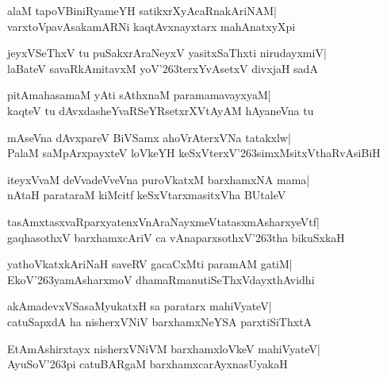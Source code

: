 \documentclass[twoside,12pt,openright]{book}
\def\S{\char'263}
\newcounter{shloka}[chapter]
\begin{document}
\begin{shloka}%
alaM tapoVBiniRyameYH satikxrXyAcaRnakAriNAM|\\
varxtoVpavAsakamARNi kaqtAvxnayxtarx mahAnatxyXpi
\end{shloka}

\begin{shloka}%
jeyxVSeThxV tu puSakxrAraNeyxV yasitxSaThxti nirudayxmiV|\\
laBateV savaRkAmitavxM yoV\S terxYvAsetxV divxjaH sadA
\end{shloka}

\begin{shloka}%
pitAmahasamaM yAti sAthxnaM paramamavayxyaM|\\
kaqteV tu dAvxdasheYvaRSeYRsetxrXVtAyAM hAyaneVna tu
\end{shloka}

\begin{shloka}%
mAseVna dAvxpareV BiVSamx ahoVrAterxVNa tatakxlw|\\
PalaM saMpArxpayxteV loVkeYH keSxVterxV\S simxMsitxVthaRvAsiBiH
\end{shloka}

\begin{shloka}%
iteyxVvaM deVvadeVveVna puroVkatxM barxhamxNA mama|\\
nAtaH parataraM kiMcitf keSxVtarxmasitxVha BUtaleV
\end{shloka}

\begin{shloka}%
tasAmxtasxvaRparxyatenxVnAraNayxmeVtatasxmAsharxyeVtf|\\
gaqhasothxV barxhamxcAriV ca vAnaparxsothxV\S tha bikuSxkaH
\end{shloka}

\begin{shloka}%
yathoVkatxkAriNaH saveRV gacaCxMti paramAM gatiM|\\
EkoV\S yamAsharxmoV dhamaRmanutiSeThxVdayxthAvidhi
\end{shloka}

\begin{shloka}%
akAmadevxVSasaMyukatxH sa paratarx mahiVyateV|\\
catuSapxdA ha nisherxVNiV barxhamxNeYSA parxtiSiThxtA
\end{shloka}

\begin{shloka}%
EtAmAshirxtayx nisherxVNiVM barxhamxloVkeV mahiVyateV|\\
AyuSoV\S pi catuBARgaM barxhamxcarAyxnasUyakaH
\end{shloka}
\end{document}

